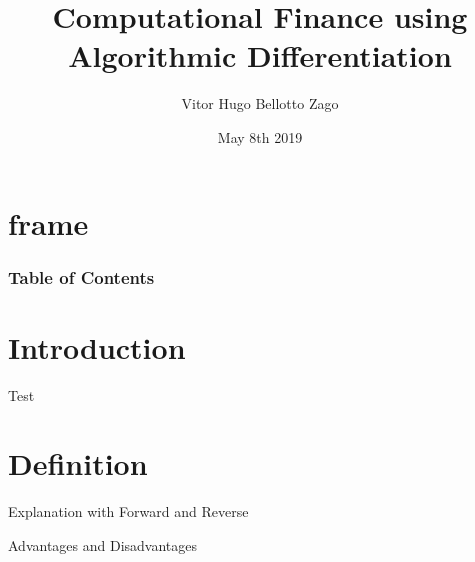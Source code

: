 \documentclass[t]{beamer}
\newcommand{\dcocpp}{{\ttfamily dco\kern-.08em{\raisebox{-.1ex}{/}\kern-.15em {c\kern-.03em{\raisebox{-.18ex}{+\kern-.028em{+}}}}}}}
\begin{document}

\title{Computational Finance using Algorithmic Differentiation}
\date{May 8th 2019}
\author{Vitor Hugo Bellotto Zago}

\frame{\titlepage}

\lstset{language=C++}
\lstset{basicstyle=\small}
\lstset{numbers=none}
\lstset{numberstyle=\scriptsize}
\lstset{numbersep=5pt}

\section{frame}

\begin{frame}
\frametitle{Table of Contents}
\tableofcontents[currentsection]
\end{frame}



\section{Introduction}
\begin{frame} Test \end{frame}

\section{Definition}
\begin{frame} Explanation with Forward and Reverse\end{frame}

\begin{frame} Advantages and Disadvantages \end{frame}
\end{document}
